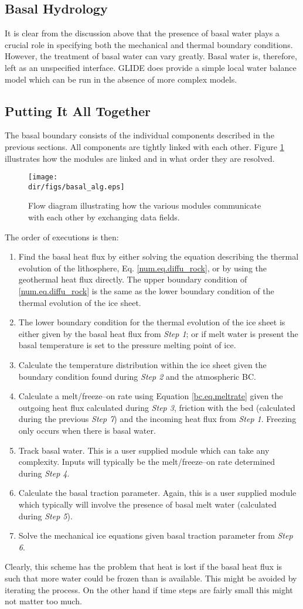 

\subsection{Basal Hydrology}
It is clear from the discussion above that the presence of basal water plays a crucial role in specifying both the mechanical and thermal boundary conditions. However, the treatment of basal water can vary greatly. Basal water is, therefore, left as an unspecified interface. GLIDE does provide a simple local water balance model which can be run in the absence of more complex models.

\subsection{Putting It All Together}
The basal boundary consists of the individual components described in the previous sections. All components are tightly linked with each other. Figure \ref{num.fig.bc_flow} illustrates how the modules are linked and in what order they are resolved.
\begin{figure}[htbp]
  \centering
  \texttt{[image: \\dir/figs/basal\_alg.eps]}
  \caption{Flow diagram illustrating how the various modules communicate with each other by exchanging data fields.}
  \label{num.fig.bc_flow}
\end{figure}
The order of executions is then:
\begin{enumerate}
\item Find the basal heat flux by either solving the equation describing the thermal evolution of the lithosphere, Eq. \eqref{num.eq.diffu_rock}, or by using the geothermal heat flux directly. The upper boundary condition of \eqref{num.eq.diffu_rock} is the same as the lower boundary condition of the thermal evolution of the ice sheet.
\item The lower boundary condition for the thermal evolution of the ice sheet is either given by the basal heat flux from \emph{Step 1}; or if melt water is present the basal temperature is set to the pressure melting point of ice.
\item Calculate the temperature distribution within the ice sheet given the boundary condition found during \emph{Step 2} and the atmospheric BC.
\item Calculate a melt/freeze--on rate using Equation \eqref{bc.eq.meltrate} given the outgoing heat flux calculated during \emph{Step 3}, friction with the bed (calculated during the previous \emph{Step 7}) and the incoming heat flux from \emph{Step 1}. Freezing only occurs when there is basal water.
\item Track basal water. This is a user supplied module which can take any complexity. Inputs will typically be the melt/freeze--on rate determined during \emph{Step 4}.
\item Calculate the basal traction parameter. Again, this is a user supplied module which typically will involve the presence of basal melt water (calculated during \emph{Step 5}).
\item Solve the mechanical ice equations given basal traction parameter from \emph{Step 6}.
\end{enumerate}
Clearly, this scheme has the problem that heat is lost if the basal heat flux is such that more water could be frozen than is available. This might be avoided by iterating the process. On the other hand if time steps are fairly small this might not matter too much.
